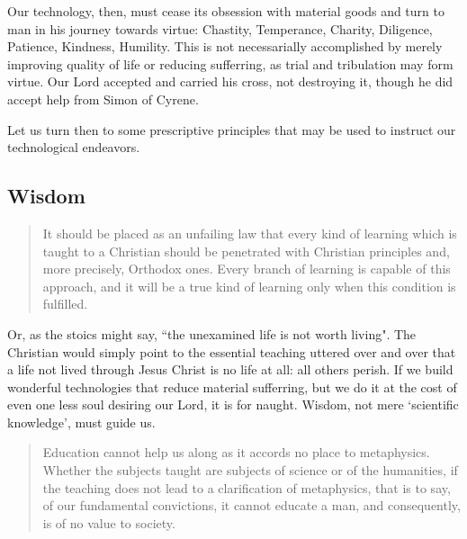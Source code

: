 \documentclass[letterpaper]{article}
\begin{document}
Our technology, then, must cease its obsession with material goods and turn to man in his journey towards virtue: Chastity, Temperance, Charity, Diligence, Patience, Kindness, Humility. This is not necessarially accomplished by merely improving quality of life or reducing sufferring, as trial and tribulation may form virtue. Our Lord accepted and carried his cross, not destroying it, though he did accept help from Simon of Cyrene.

Let us turn then to some prescriptive principles that may be used to instruct our technological endeavors.

\subsection{Wisdom}

\begin{quote}
  It should be placed as an unfailing law that every kind of learning which is taught to a Christian should be penetrated with Christian principles and, more precisely, Orthodox ones. Every branch of learning is capable of this approach, and it will be a true kind of learning only when this condition is fulfilled.
\end{quote}

Or, as the stoics might say, ``the unexamined life is not worth living". The Christian would simply point to the essential teaching uttered over and over that a life not lived through Jesus Christ is no life at all: all others perish. If we build wonderful technologies that reduce material sufferring, but we do it at the cost of even one less soul desiring our Lord, it is for naught. Wisdom, not mere `scientific knowledge', must guide us.

\iffalse
Indeed to harken back to Eden,

\begin{quote}
  Sorrow is knowledge; they who know the most
  Must mourn the deepest o'er the fatal truth,
  The Tree of Knowledge is not that of Life.
  \attrib{\textit{Manfred}, George Gordon Byron 1817}
\end{quote}
\fi

\begin{quote}
  Education cannot help us along as it accords no place to metaphysics. Whether the subjects taught are subjects of science or of the humanities, if the teaching does not lead to a clarification of metaphysics, that is to say, of our fundamental convictions, it cannot educate a man, and consequently, is of no value to society.
\end{quote}
\end{document}
